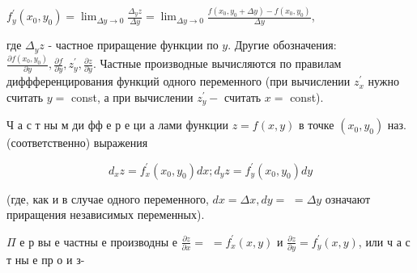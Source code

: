 \documentclass[10pt]{article}
\begin{document}
$f_{y}^{\prime}\left(x_{0}, y_{0}\right)=\lim _{\Delta y \rightarrow 0} \frac{\Delta_{y} z}{\Delta y}=\lim _{\Delta y \rightarrow 0} \frac{f\left(x_{0}, y_{0}+\Delta y\right)-f\left(x_{0}, y_{0}\right)}{\Delta y}$,



где $\Delta_{y} z$ - частное приращение функции по $y$. Другие обозначения: $\frac{\partial f\left(x_{0}, y_{0}\right)}{\partial y}, \frac{\partial f}{\partial y}, z_{y}^{\prime}, \frac{\partial z}{\partial y}$. Частные производные вычисляются по правилам диффференцирования функций одного переменного (при вычислении $z_{x}^{\prime}$ нужно считать $y=$ const, а при вычислении $z_{y}^{\prime}-$ считать $x=$ const).



Ч а с т ны м ди фф е р е ци а лами функции $z=f(x, y)$ в точке $\left(x_{0}, y_{0}\right)$ наз. (соответственно) выражения



\[

d_{x} z=f_{x}^{\prime}\left(x_{0}, y_{0}\right) d x ; d_{y} z=f_{y}^{\prime}\left(x_{0}, y_{0}\right) d y

\]



(где, как и в случае одного переменного, $d x=\Delta x, d y=$ $=\Delta y$ означают приращения независимых переменных).



$\Pi$ е р вы е частны е производны е $\frac{\partial z}{\partial x}=$ $=f_{x}^{\prime}(x, y)$ и $\frac{\partial z}{\partial y}=f_{y}^{\prime}(x, y)$, или ч а с т ны е пр о и з-
\end{document}
